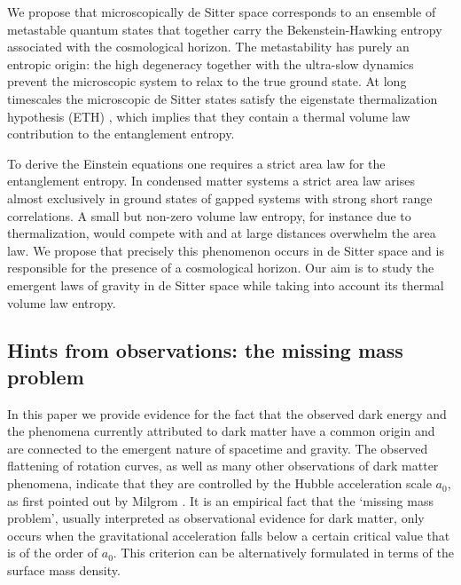 \documentclass[a4paper,12pt]{article}
\begin{document}
 We propose that microscopically de Sitter space corresponds to an ensemble of  metastable quantum states that together carry the Bekenstein-Hawking entropy associated with the cosmological horizon. %
The metastability has purely an entropic origin: the high degeneracy together with the ultra-slow 
dynamics prevent the microscopic system to relax to the true ground state. At long timescales the microscopic de Sitter states satisfy the eigenstate thermalization hypothesis  (ETH) \cite{ETH1,ETH2}, which implies that they contain a thermal volume law contribution to the entanglement entropy.   
 
To derive the Einstein equations one requires a strict area law for the
entanglement entropy.  In condensed matter systems a strict area law arises almost exclusively 
in ground states of gapped systems with strong short range correlations. A small but non-zero volume law entropy, for instance due to thermalization, would compete with and at large 
distances overwhelm the area law. We propose that precisely this phenomenon occurs in de Sitter space and is responsible for the presence of a cosmological horizon. Our aim is to study the emergent laws of gravity in de Sitter space while taking into account its thermal volume law entropy. 
 
 

\subsection{Hints from observations: the missing mass problem}


In this paper we provide evidence for the fact that the observed dark energy %
and the phenomena currently attributed to dark matter have a common origin and are 
connected to the emergent nature of spacetime and gravity. 
The observed 
flattening of rotation curves, as well as many other observations of dark matter phenomena, 
indicate that they are controlled 
by the Hubble acceleration scale $a_0$, as first pointed out by Milgrom \cite{Milgrom:1983}.  It is an 
empirical fact \cite{BekensteinMilgrom, Milgrom, Sanders} that the `missing mass problem', usually interpreted as observational evidence for dark matter,  only occurs when the 
gravitational acceleration %
falls below a certain critical value that is of the order of $a_0$.   This criterion can be alternatively formulated in terms of the surface mass density. 
\end{document}
